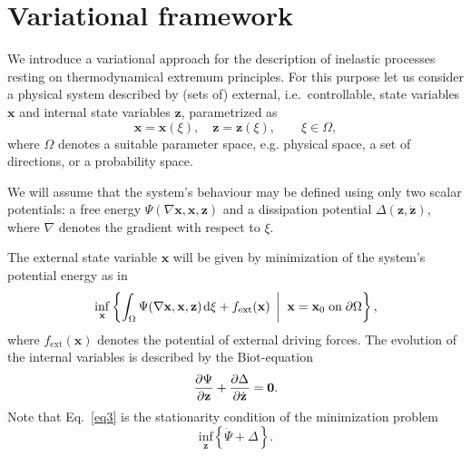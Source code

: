 \documentclass[final,1p,times]{elsarticle}
\newcommand{\be}{\begin{equation}}
\newcommand{\ee}{\end{equation}}
\newcommand{\bfm}[1]{ \mathbf{#1} }
\def\dd{\;\!\mathrm{d}}
\renewcommand{\inf}[3]{
\underset{#1}{\mathrm{inf}}\left\lbrace #2 \; \left| \vphantom{#2}\vphantom{#3} \right. \; #3 \right\rbrace
}
\newcommand{\infr}[2]{
\underset{#1}{\mathrm{inf}}\left\lbrace #2 \right\rbrace
}
\begin{document}
\section{Variational framework}\label{sec:vf}

We introduce a variational approach for the description of inelastic processes resting on thermodynamical extremum principles. For this purpose let us consider a physical system described by (sets of) external, i.e.\ controllable, state variables $\bfm{x}$ and internal state variables $\bfm{z}$, parametrized as
\be
\label{eq1}
{\bfm{x}}={\bfm{x}}(\xi), \quad {\bfm{z}}={\bfm{z}}(\xi), \qquad \xi\in\Omega,
\ee
where $\Omega$ denotes a suitable parameter space, e.g. physical space, a set  of directions, or a probability space.

We will assume that the system's behaviour may be defined using only two scalar potentials: a free energy $\Psi(\nabla\bfm{x},\bfm{x},\bfm{z})$ and a dissipation potential $\Delta(\bfm{z},\dot{\bfm{z}})$, where $\nabla$ denotes the gradient with respect to $\xi$.

The external state variable $\bfm{x}$ will be given by minimization of the system's potential energy as in
\be
\label{eq2}
\inf{\bfm{x}}{\int_\Omega \Psi(\nabla\bfm{x},\bfm{x},\bfm{z}) \dd\xi + f_\mathrm{ext}(\bfm{x})}{\bfm{x}=\bfm{x}_0 \;\mbox{on}\; \partial\Omega},
\ee
where $f_\mathrm{ext}(\bfm{x})$ denotes the potential of external driving forces. The evolution of the internal variables is described by the Biot-equation
\be
\label{eq3}
\frac{\partial \Psi}{\partial {\bfm{z}}}+\frac{\partial \Delta}{\partial \dot{\bfm{z}}} = {\bf 0}.
\ee
Note that Eq.\  \eqref{eq3} is the stationarity condition of the minimization problem
\be
\label{eq4}
\infr{\dot{\bfm{z}}}{\dot{\Psi} + \Delta}.
\ee
\end{document}
